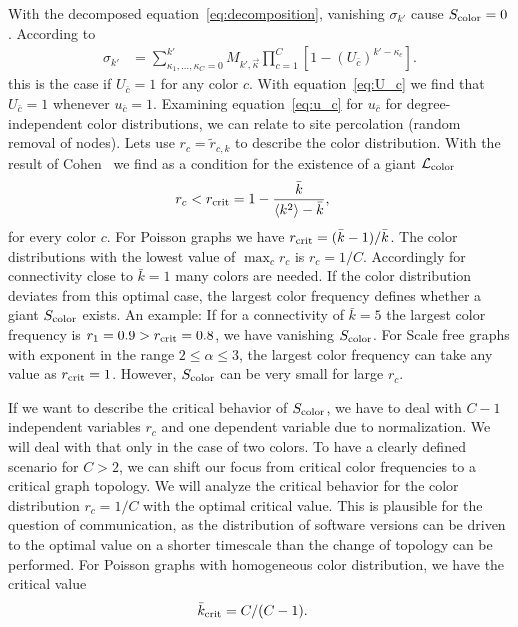 \documentclass[aps, pre, onecolumn, a4paper, floatfix]{revtex4}
\begin{document}
With the decomposed equation~\ref{eq:decomposition}, vanishing $\sigma_{k'}$
cause $S_{\rm color}=0$. According to  
\begin{align}
\sigma_{k'} &= \sum_{\kappa_1,\dots, \kappa_C=0}^{k'} M_{k',\vec \kappa} 
\prod_{c=1}^C [1-(U_{\bar c})^{k'- \kappa_c }].\label{eq:p_success}
\end{align}
this is the case if $U_{\bar c}=1$ for any color $c$. 
With equation~\ref{eq:U_c} we find that $U_{\bar c}=1$ whenever $u_{\bar c}=1$. 
Examining equation~\ref{eq:u_c} for $u_{\bar c}$ for degree-independent color distributions, 
we can relate to site percolation (random removal of nodes). 
Lets use $r_c=\tilde{r}_{c,k}$ to describe the color distribution. 
With the result of Cohen~\cite{cohen-2000resilience} we find as a condition for the existence of a giant $\mathcal{L}_{\rm color}$
\begin{align}
r_c < r_{\rm crit} &= 1-\frac{\bar{k}}{\left<k^2\right>-\bar{k}}, 
\end{align}
for every color $c$. 
For Poisson graphs we have $r_{\rm crit}=(\bar{k}-1)/\bar{k}$.
The color distributions with the lowest value of $\max_c r_c$ is $r_c=1/C$. 
Accordingly for connectivity close to $\bar{k}=1$ many colors are needed. 
If the color distribution deviates from this optimal case, 
the largest color frequency defines whether a giant $S_{\rm color }$ exists. 
An example: If for a connectivity of $\bar{k}=5$ 
the largest color frequency is $r_1=0.9> r_{\rm crit}=0.8$, 
we have vanishing $S_{\rm color }$. 
For Scale free graphs with exponent in the range $2\leq \alpha \leq 3$, 
the largest color frequency can take any value as $r_{\rm crit}=1$. 
However, $S_{\rm color }$ can be very small for large $r_c$. 

If we want to describe the critical behavior of $S_{\rm color}$, 
we have to deal with $C-1$ independent variables $r_c$ 
and one dependent variable due to normalization. 
We will deal with that only in the case of two colors. 
To have a clearly defined scenario for $C>2$, we can shift our focus 
from critical color frequencies to a critical graph topology. 
We will analyze the critical behavior 
for the color distribution $r_c=1/C$ with the optimal critical value. 
This is plausible for the question of communication, 
as the distribution of software versions can be driven to the optimal value 
on a shorter timescale than the change of topology can be performed. 
For Poisson graphs with homogeneous color distribution, we have the critical value 
\begin{align}
\bar{k}_{\rm crit} &= C/(C-1). 
\end{align}
\end{document}
